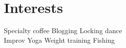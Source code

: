 \documentclass[]{deedy-resume-reversed}
\renewcommand{\sectionsep}{\vspace{4pt}}
\begin{document}
\begin{minipage}[t]{0.38\textwidth}
\sectionsep{}









\section{Interests}
Specialty coffee \textbullet{} Blogging \textbullet{} Locking dance \\
Improv \textbullet{} Yoga \textbullet{} Weight training \textbullet{} Fishing

\sectionsep



\end{minipage}
\end{document}
